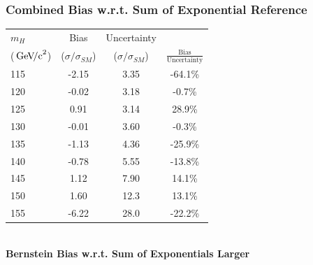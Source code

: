 \documentclass{beamer}
\newcommand{\GeVcc}{\ensuremath{\,\mathrm{Ge\kern -0.1em V\!/c}^2}}
\begin{document}
\begin{frame}
\frametitle{Combined Bias w.r.t. Sum of Exponential Reference}
  \begin{center}
    \scriptsize
    \begin{tabular}{|l|c|c|c|} \hline
$m_H$         & Bias & Uncertainty & \\ 
(\GeVcc{})         & ($\sigma/\sigma_{SM}$) & ($\sigma/\sigma_{SM}$) & $\frac{\mathrm{Bias}}{\mathrm{Uncertainty}}$ \\ \hline \hline
115   &      -2.15  &       3.35      &    -64.1\%    \\ \hline
120   &      -0.02  &       3.18      &     -0.7\%    \\ \hline
125   &       0.91  &       3.14      &     28.9\%    \\ \hline
130   &      -0.01  &       3.60      &     -0.3\%    \\ \hline
135   &      -1.13  &       4.36      &    -25.9\%    \\ \hline
140   &      -0.78  &       5.55      &    -13.8\%    \\ \hline
145   &       1.12  &       7.90      &     14.1\%    \\ \hline
150   &       1.60  &      12.3       &     13.1\%    \\ \hline
155   &      -6.22  &      28.0       &    -22.2\%    \\ \hline
    \end{tabular}
\\
  \small
\normalsize
\vspace{1em}
\textbf{Bernstein Bias w.r.t. Sum of Exponentials Larger}
  \end{center}
\end{frame}
\end{document}
